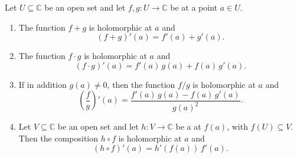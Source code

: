 \begin{proposition} \label{proposition:complex_derivative_rules_for_sum_product_quotient_and_chain}
Let $U \subseteq \mathbb{C}$ be an open set and let $f, g : U \to \mathbb{C}$ be  at a point $a \in U$.

\begin{enumerate}
    \item[\textbf{(Sum rule)}] The function $f + g$ is holomorphic at $a$ and
    $$(f + g)'(a) = f'(a) + g'(a).$$

    \item[\textbf{(Product rule)}] The function $f \cdot g$ is holomorphic at $a$ and
    $$(f \cdot g)'(a) = f'(a)\,g(a) + f(a)\,g'(a).$$

    \item[\textbf{(Quotient rule)}] If in addition $g(a) \neq 0$, then the function $f/g$ is holomorphic at $a$ and
    $$\left(\frac{f}{g}\right)'(a) = \frac{f'(a)\,g(a) - f(a)\,g'(a)}{g(a)^2}.$$

    \item[\textbf{(Chain rule)}] Let $V \subseteq \mathbb{C}$ be an open set and let $h : V \to \mathbb{C}$ be a  at $f(a)$, with $f(U) \subseteq V$. Then the composition $h \circ f$ is holomorphic at $a$ and
    $$(h \circ f)'(a) = h'(f(a))\,f'(a).$$
\end{enumerate}
\end{proposition}

